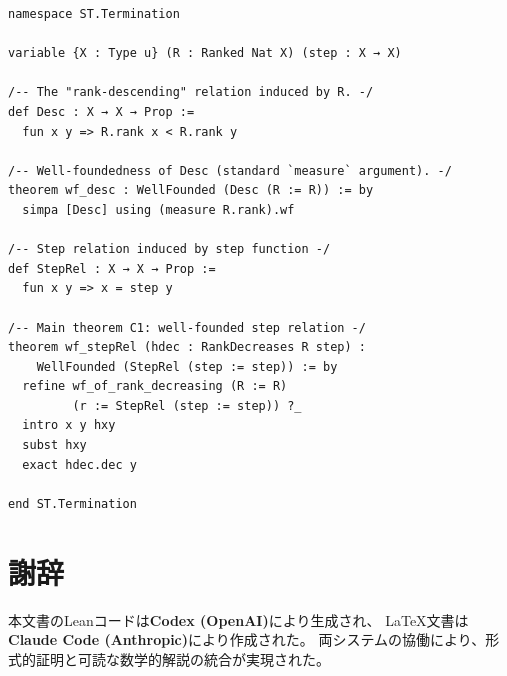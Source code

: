 \documentclass[11pt,a4paper]{ltjsarticle}
\theoremstyle{definition}
\begin{document}
\begin{verbatim}
namespace ST.Termination

variable {X : Type u} (R : Ranked Nat X) (step : X → X)

/-- The "rank-descending" relation induced by R. -/
def Desc : X → X → Prop :=
  fun x y => R.rank x < R.rank y

/-- Well-foundedness of Desc (standard `measure` argument). -/
theorem wf_desc : WellFounded (Desc (R := R)) := by
  simpa [Desc] using (measure R.rank).wf

/-- Step relation induced by step function -/
def StepRel : X → X → Prop :=
  fun x y => x = step y

/-- Main theorem C1: well-founded step relation -/
theorem wf_stepRel (hdec : RankDecreases R step) :
    WellFounded (StepRel (step := step)) := by
  refine wf_of_rank_decreasing (R := R)
         (r := StepRel (step := step)) ?_
  intro x y hxy
  subst hxy
  exact hdec.dec y

end ST.Termination
\end{verbatim}

\section*{謝辞}

本文書のLeanコードは\textbf{Codex (OpenAI)}により生成され、
\LaTeX{}文書は\textbf{Claude Code (Anthropic)}により作成された。
両システムの協働により、形式的証明と可読な数学的解説の統合が実現された。
\end{document}

